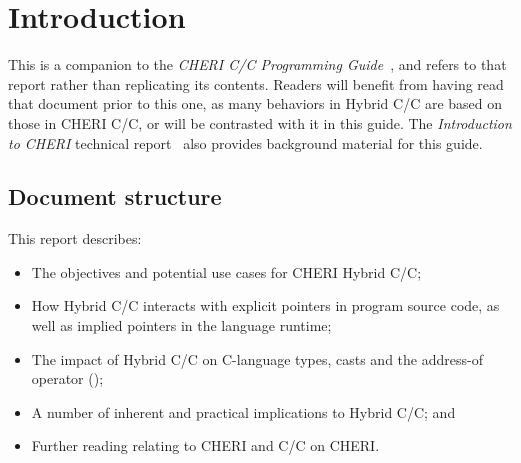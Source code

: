 \documentclass[12pt,twoside,openright,a4paper]{article}
\newcommand{\ccode}[1]{{\small\ttfamily{#1}}}
\newcommand{\note}[2]{{\color{blue}[ Note: #1 - #2]}}
\renewcommand{\note}[2]{\relax\ifhmode\unskip\fi}
\newcommand{\rwnote}[1]{\note{#1}{Robert W.}}
\newcommand*{\cpp}{\texorpdfstring{C\textsmaller[2]{\protect\nolinebreak[4]\hspace{-.05em}\raisebox{.45ex}{\textbf{++}}}}{C++}}
\newcommand*{\COrCpp}{C/\cpp{}}
\newcommand*{\purecapCOrCpp}{CHERI \COrCpp{}}
\newcommand*{\CHERIhybridCOrCpp}{CHERI Hybrid \COrCpp{}}
\newcommand*{\hybridCOrCpp}{Hybrid \COrCpp{}}
\begin{document}
\newcommand{\reviewwarning}{
\textbf{
As \hybridCOrCpp{} remains an area of active research and development, this
report is a request for review and comments rather than a specification.
}
\rwnote{This last sentence will go away in a final version.}
}

\begin{abstract}
\abstracttext

\reviewwarning
\end{abstract}

\newpage
\setcounter{tocdepth}{2}
\tableofcontents

\newpage

\section{Introduction}

%
%
\abstracttext

This is a companion to the \textit{\purecapCOrCpp{} Programming
Guide}~\cite{UCAM-CL-TR-947}, and refers to that report rather than
replicating its contents.
Readers will benefit from having read that document prior to this one, as
many behaviors in \hybridCOrCpp{} are based on those in \purecapCOrCpp{}, or
will be contrasted with it in this guide.
The \textit{Introduction to CHERI} technical
report~\cite{UCAM-CL-TR-941} also provides background material for this
guide.

\subsection{Document structure}

This report describes:

\begin{itemize}
\item The objectives and potential use cases for \CHERIhybridCOrCpp{};
\item How \hybridCOrCpp{} interacts with explicit pointers in program source
  code, as well as implied pointers in the language runtime;
\item The impact of \hybridCOrCpp{} on C-language types, casts and the address-of operator
  (\ccode{\&});
\item A number of inherent and practical implications to \hybridCOrCpp{}; and
\item Further reading relating to CHERI and \COrCpp{} on CHERI.
\end{itemize}
\end{document}
